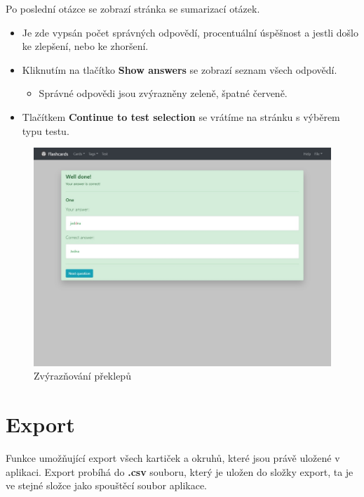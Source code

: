 \documentclass[11pt]{article}
\providecommand{\tightlist}{\setlength{\itemsep}{1pt}\setlength{\parskip}{1pt}}
\begin{document}
Po poslední otázce se zobrazí stránka se sumarizací otázek.

\begin{itemize}
\tightlist
\item
  Je zde vypsán počet správných odpovědí, procentuální úspěšnost a
  jestli došlo ke zlepšení, nebo ke zhoršení.
\item
  Kliknutím na tlačítko \textbf{Show answers} se zobrazí seznam všech
  odpovědí.

  \begin{itemize}
  \tightlist
  \item
    Správné odpovědi jsou zvýrazněny zeleně, špatné červeně.
  \end{itemize}
\item
  Tlačítkem \textbf{Continue to test selection} se vrátíme na stránku s
  výběrem typu testu.
\end{itemize}

\begin{figure}
\centering
\includegraphics{../../../../assets/write_halfcorrect.jpg}
\caption{Zvýrazňování překlepů}
\end{figure}

\hypertarget{export}{%
\section{Export}\label{export}}

Funkce umožňující export všech kartiček a okruhů, které jsou právě
uložené v aplikaci. Export probíhá do \textbf{.csv} souboru, který je
uložen do složky export, ta je ve stejné složce jako spouštěcí soubor
aplikace.
\end{document}
